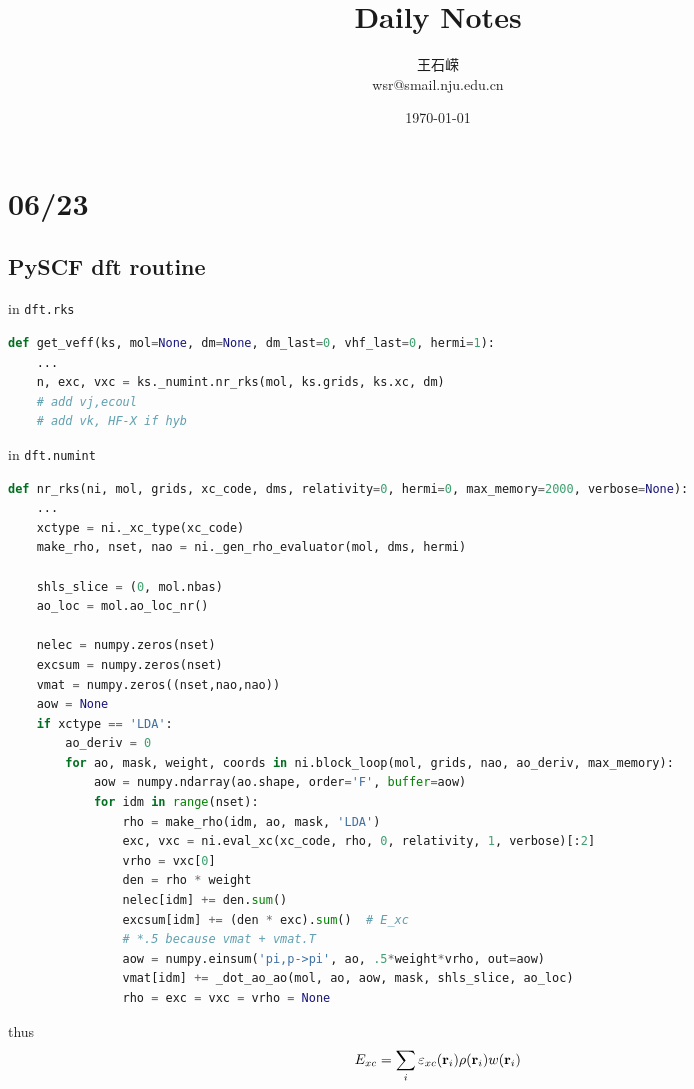 \documentclass[a4paper]{article}
\title{Daily Notes}
\author{王石嵘\\
wsr@smail.nju.edu.cn
}
\date{\today} %
\newcommand{\code}[1]{\colorbox{codegray}{\texttt{#1}}}
\begin{document}

\maketitle

\tableofcontents

\newpage

\section{06/23}
\subsection{PySCF dft routine}
in \code{dft.rks}
\begin{lstlisting}[language=python]
def get_veff(ks, mol=None, dm=None, dm_last=0, vhf_last=0, hermi=1):
    ...
    n, exc, vxc = ks._numint.nr_rks(mol, ks.grids, ks.xc, dm)
    # add vj,ecoul
    # add vk, HF-X if hyb
\end{lstlisting}
in \code{dft.numint}
\begin{lstlisting}[language=python]
def nr_rks(ni, mol, grids, xc_code, dms, relativity=0, hermi=0, max_memory=2000, verbose=None):
    ...
    xctype = ni._xc_type(xc_code)
    make_rho, nset, nao = ni._gen_rho_evaluator(mol, dms, hermi)
    
    shls_slice = (0, mol.nbas)
    ao_loc = mol.ao_loc_nr()
    
    nelec = numpy.zeros(nset)
    excsum = numpy.zeros(nset)
    vmat = numpy.zeros((nset,nao,nao))
    aow = None
    if xctype == 'LDA':
	    ao_deriv = 0
	    for ao, mask, weight, coords in ni.block_loop(mol, grids, nao, ao_deriv, max_memory):
	 	    aow = numpy.ndarray(ao.shape, order='F', buffer=aow)
	        for idm in range(nset):
		 	    rho = make_rho(idm, ao, mask, 'LDA')
		 	    exc, vxc = ni.eval_xc(xc_code, rho, 0, relativity, 1, verbose)[:2]
			    vrho = vxc[0]
			    den = rho * weight
			    nelec[idm] += den.sum()
			    excsum[idm] += (den * exc).sum()  # E_xc 
			    # *.5 because vmat + vmat.T
			    aow = numpy.einsum('pi,p->pi', ao, .5*weight*vrho, out=aow)
			    vmat[idm] += _dot_ao_ao(mol, ao, aow, mask, shls_slice, ao_loc)
			    rho = exc = vxc = vrho = None
\end{lstlisting}
thus
\begin{equation}\label{key}
E_{xc} = \sum_i \varepsilon_{xc}(\vb{r}_i)\rho(\vb{r}_i) w(\vb{r}_i)
\end{equation}
\end{document}
